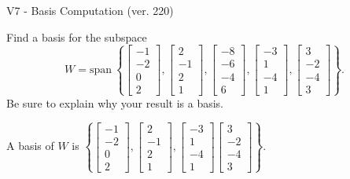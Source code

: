 \begin{exercise}
  \begin{exerciseTitle}V7 - Basis Computation (ver. 220)\end{exerciseTitle}
  \begin{exerciseStatement}
    Find a basis for the subspace 
\[W=\mathrm{span}\ \left\{\left[\begin{array}{r}
-1 \\
-2 \\
0 \\
2
\end{array}\right] , \left[\begin{array}{r}
2 \\
-1 \\
2 \\
1
\end{array}\right] , \left[\begin{array}{r}
-8 \\
-6 \\
-4 \\
6
\end{array}\right] , \left[\begin{array}{r}
-3 \\
1 \\
-4 \\
1
\end{array}\right] , \left[\begin{array}{r}
3 \\
-2 \\
-4 \\
3
\end{array}\right]\right\}.\]
 Be sure to explain why your result is a basis.


  \end{exerciseStatement}
  \begin{exerciseAnswer}
   A basis of \(W\) is  \(\left\{\left[\begin{array}{r}
-1 \\
-2 \\
0 \\
2
\end{array}\right] , \left[\begin{array}{r}
2 \\
-1 \\
2 \\
1
\end{array}\right] , \left[\begin{array}{r}
-3 \\
1 \\
-4 \\
1
\end{array}\right] \left[\begin{array}{r}
3 \\
-2 \\
-4 \\
3
\end{array}\right]\right\}\).
  


  \end{exerciseAnswer}
\end{exercise}